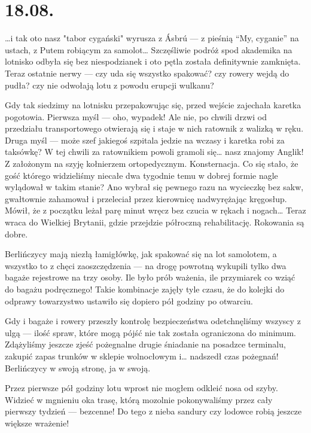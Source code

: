 \chapter*{18.08.}

…i tak oto nasz "tabor cygański" wyrusza z Ásbrú --- z pieśnią “My, cyganie” na ustach, z Putem robiącym za samolot… Szczęśliwie podróż spod akademika na lotnisko odbyła się bez niespodzianek i oto pętla została definitywnie zamknięta. Teraz ostatnie nerwy --- czy uda się wszystko spakować? czy rowery wejdą do pudła? czy nie odwołają lotu z powodu erupcji wulkanu?

Gdy tak siedzimy na lotnisku przepakowując się, przed wejście zajechała karetka pogotowia. Pierwsza myśl --- oho, wypadek! Ale nie, po chwili drzwi od przedziału transportowego otwierają się i staje w nich ratownik z walizką w ręku. Druga myśl --- może szef jakiegoś szpitala jedzie na wczasy i karetka robi za taksówkę? W tej chwili za ratownikiem powoli gramoli się… nasz znajomy Anglik! Z założonym na szyję kołnierzem ortopedycznym. Konsternacja. Co się stało, że gość którego widzieliśmy niecałe dwa tygodnie temu w dobrej formie nagle wylądował w takim stanie? Ano wybrał się pewnego razu na wycieczkę bez sakw, gwałtownie zahamował i przeleciał przez kierownicę nadwyrężając kręgosłup. Mówił, że z początku leżał parę minut wręcz bez czucia w rękach i nogach… Teraz wraca do Wielkiej Brytanii, gdzie przejdzie półroczną rehabilitację. Rokowania są dobre.

Berlińczycy mają niezłą łamigłówkę, jak spakować się na lot samolotem, a wszystko to z chęci zaoszczędzenia --- na drogę powrotną wykupili tylko dwa bagaże rejestrowe na trzy osoby. Ile było prób ważenia, ile przymiarek co wziąć do bagażu podręcznego! Takie kombinacje zajęły tyle czasu, że do kolejki do odprawy towarzystwo ustawiło się dopiero pół godziny po otwarciu.


Gdy i bagaże i rowery przeszły kontrolę bezpieczeństwa odetchnęliśmy wszyscy z ulgą --- ilość spraw, które mogą pójść nie tak została ograniczona do minimum. Zdążyliśmy jeszcze zjeść pożegnalne drugie śniadanie na posadzce terminalu, zakupić zapas trunków w sklepie wolnocłowym i… nadszedł czas pożegnań! Berlińczycy w swoją stronę, ja w swoją.

Przez pierwsze pół godziny lotu wprost nie mogłem odkleić nosa od szyby. Widzieć w mgnieniu oka trasę, którą mozolnie pokonywaliśmy przez cały pierwszy tydzień --- bezcenne! Do tego z nieba sandury czy lodowce robią jeszcze większe wrażenie!

